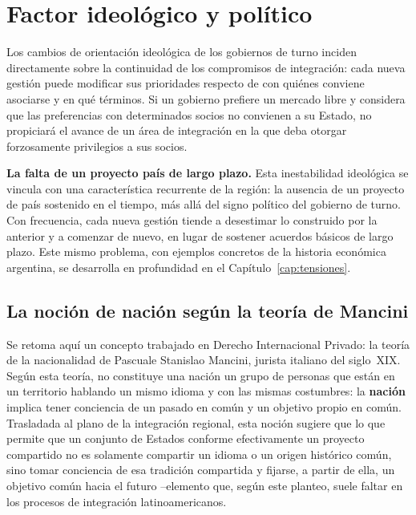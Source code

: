 \documentclass[12pt,oneside]{book}
\begin{document}
\section{Factor ideológico y político}

Los cambios de orientación ideológica de los gobiernos de turno inciden directamente sobre la continuidad de los compromisos de integración: cada nueva gestión puede modificar sus prioridades respecto de con quiénes conviene asociarse y en qué términos. Si un gobierno prefiere un mercado libre y considera que las preferencias con determinados socios no convienen a su Estado, no propiciará el avance de un área de integración en la que deba otorgar forzosamente privilegios a sus socios.

\begin{nota}
\textbf{La falta de un proyecto país de largo plazo.} Esta inestabilidad ideológica se vincula con una característica recurrente de la región: la ausencia de un proyecto de país sostenido en el tiempo, más allá del signo político del gobierno de turno. Con frecuencia, cada nueva gestión tiende a desestimar lo construido por la anterior y a comenzar de nuevo, en lugar de sostener acuerdos básicos de largo plazo. Este mismo problema, con ejemplos concretos de la historia económica argentina, se desarrolla en profundidad en el Capítulo~\ref{cap:tensiones}.
\end{nota}

\subsection{La noción de nación según la teoría de Mancini}

Se retoma aquí un concepto trabajado en Derecho Internacional Privado: la teoría de la nacionalidad de Pascuale Stanislao Mancini, jurista italiano del siglo~XIX. Según esta teoría, no constituye una nación un grupo de personas que están en un territorio hablando un mismo idioma y con las mismas costumbres: la \textbf{nación} implica tener conciencia de un pasado en común y un objetivo propio en común. Trasladada al plano de la integración regional, esta noción sugiere que lo que permite que un conjunto de Estados conforme efectivamente un proyecto compartido no es solamente compartir un idioma o un origen histórico común, sino tomar conciencia de esa tradición compartida y fijarse, a partir de ella, un objetivo común hacia el futuro --elemento que, según este planteo, suele faltar en los procesos de integración latinoamericanos.
\end{document}
